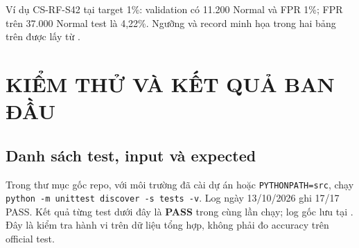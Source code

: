 \documentclass[12pt,a4paper,oneside]{report}
\begin{document}
Ví dụ CS-RF-S42 tại target 1\%: validation có 11.200 Normal và FPR 1\%; FPR trên 37.000 Normal test là 4,22\%. Ngưỡng và record minh họa trong hai bảng trên được lấy từ .

\chapter{KIỂM THỬ VÀ KẾT QUẢ BAN ĐẦU}
\section{Danh sách test, input và expected}\label{sec:tests}
Trong thư mục gốc repo, với môi trường đã cài dự án hoặc \texttt{PYTHONPATH=src}, chạy \texttt{python -m unittest discover -s tests -v}. Log ngày 13/10/2026 ghi 17/17 PASS. Kết quả từng test dưới đây là \textbf{PASS} trong cùng lần chạy; log gốc lưu tại . Đây là kiểm tra hành vi trên dữ liệu tổng hợp, không phải đo accuracy trên official test.
\begingroup{}\fontsize{10pt}{12pt}\selectfont\setlength{\tabcolsep}{3pt}\renewcommand{\arraystretch}{1.16}
\end{document}
